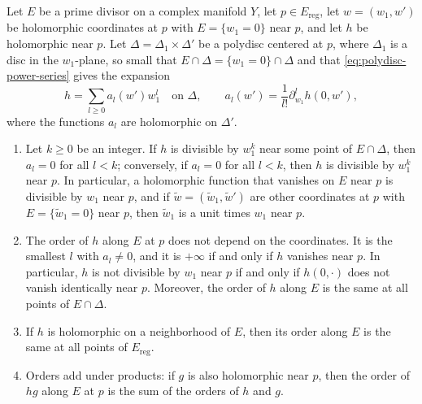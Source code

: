 \begin{lemma}\label{lem:divisor-order-independent}
Let $E$ be a prime divisor on a complex manifold $Y$, let $p\in E_{\mathrm{reg}}$, let $w=(w_1,w')$ be holomorphic coordinates at $p$ with $E=\{w_1=0\}$ near $p$, and let $h$ be holomorphic near $p$. Let $\Delta=\Delta_1\times\Delta'$ be a polydisc centered at $p$, where $\Delta_1$ is a disc in the $w_1$-plane, so small that $E\cap\Delta=\{w_1=0\}\cap\Delta$ and that \eqref{eq:polydisc-power-series} gives the expansion
\[
 h=\sum_{l\geq0}a_l(w')w_1^l\quad\text{on }\Delta,\qquad a_l(w')=\frac1{l!}\partial_{w_1}^lh(0,w'),
\]
where the functions $a_l$ are holomorphic on $\Delta'$.
\begin{enumerate}
\item Let $k\geq0$ be an integer. If $h$ is divisible by $w_1^k$ near some point of $E\cap\Delta$, then $a_l=0$ for all $l<k$; conversely, if $a_l=0$ for all $l<k$, then $h$ is divisible by $w_1^k$ near $p$. In particular, a holomorphic function that vanishes on $E$ near $p$ is divisible by $w_1$ near $p$, and if $\tilde w=(\tilde w_1,\tilde w')$ are other coordinates at $p$ with $E=\{\tilde w_1=0\}$ near $p$, then $\tilde w_1$ is a unit times $w_1$ near $p$.
\item The order of $h$ along $E$ at $p$ does not depend on the coordinates. It is the smallest $l$ with $a_l\neq0$, and it is $+\infty$ if and only if $h$ vanishes near $p$. In particular, $h$ is not divisible by $w_1$ near $p$ if and only if $h(0,\cdot)$ does not vanish identically near $p$. Moreover, the order of $h$ along $E$ is the same at all points of $E\cap\Delta$.
\item If $h$ is holomorphic on a neighborhood of $E$, then its order along $E$ is the same at all points of $E_{\mathrm{reg}}$.
\item Orders add under products: if $g$ is also holomorphic near $p$, then the order of $hg$ along $E$ at $p$ is the sum of the orders of $h$ and $g$.
\end{enumerate}
\end{lemma}
